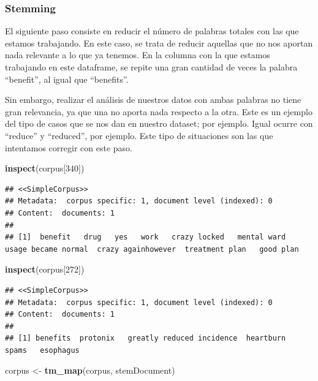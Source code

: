 \documentclass[spanish,]{article}
\newenvironment{Shaded}{\begin{snugshade}}{\end{snugshade}}
\newcommand{\KeywordTok}[1]{\textcolor[rgb]{0.13,0.29,0.53}{\textbf{#1}}}
\newcommand{\DecValTok}[1]{\textcolor[rgb]{0.00,0.00,0.81}{#1}}
\newcommand{\StringTok}[1]{\textcolor[rgb]{0.31,0.60,0.02}{#1}}
\newcommand{\NormalTok}[1]{#1}
\begin{document}
\subsubsection{Stemming}\label{stemming}

El siguiente paso consiste en reducir el número de palabras totales con
las que estamos trabajando. En este caso, se trata de reducir aquellas
que no nos aportan nada relevante a lo que ya tenemos. En la columna con
la que estamos trabajando en este dataframe, se repite una gran cantidad
de veces la palabra ``benefit'', al igual que ``benefits''.

Sin embargo, realizar el análisis de nuestros datos con ambas palabras
no tiene gran relevancia, ya que una no aporta nada respecto a la otra.
Este es un ejemplo del tipo de casos que se nos dan en nuestro dataset;
por ejemplo. Igual ocurre con ``reduce'' y ``reduced'', por ejemplo.
Este tipo de situaciones son las que intentamos corregir con este paso.

\begin{Shaded}
\begin{Highlighting}[]
\KeywordTok{inspect}\NormalTok{(corpus[}\DecValTok{340}\NormalTok{])}
\end{Highlighting}
\end{Shaded}

\begin{verbatim}
## <<SimpleCorpus>>
## Metadata:  corpus specific: 1, document level (indexed): 0
## Content:  documents: 1
## 
## [1]  benefit   drug   yes   work   crazy locked   mental ward    usage became normal  crazy againhowever  treatment plan   good plan
\end{verbatim}

\begin{Shaded}
\begin{Highlighting}[]
\KeywordTok{inspect}\NormalTok{(corpus[}\DecValTok{272}\NormalTok{])}
\end{Highlighting}
\end{Shaded}

\begin{verbatim}
## <<SimpleCorpus>>
## Metadata:  corpus specific: 1, document level (indexed): 0
## Content:  documents: 1
## 
## [1] benefits  protonix   greatly reduced incidence  heartburn  spams   esophagus
\end{verbatim}

\begin{Shaded}
\begin{Highlighting}[]
\NormalTok{corpus <-}\StringTok{ }\KeywordTok{tm_map}\NormalTok{(corpus, stemDocument)}
\end{Highlighting}
\end{Shaded}
\end{document}
